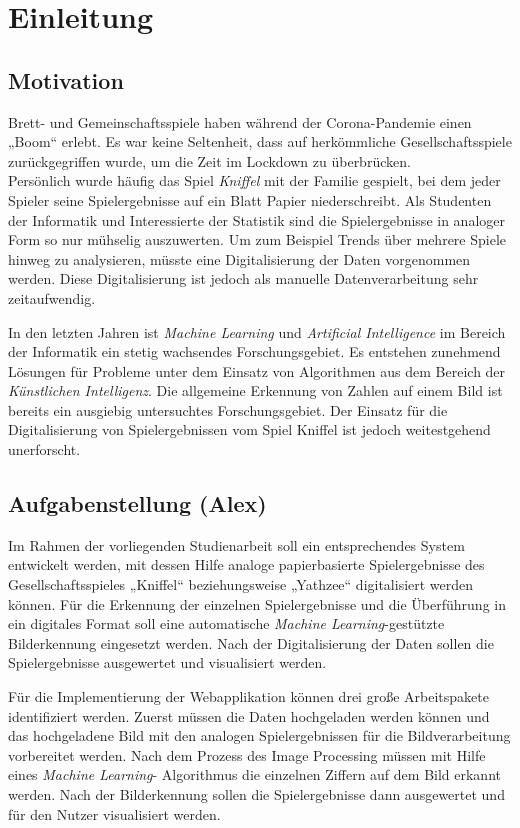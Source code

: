 \chapter{Einleitung}
\section{Motivation}
Brett- und Gemeinschaftsspiele haben während der Corona-Pandemie einen „Boom“ erlebt. Es war keine Seltenheit, dass auf herkömmliche Gesellschaftsspiele zurückgegriffen wurde, um die Zeit im Lockdown zu überbrücken. \cite{dw_2021}\\
Persönlich wurde häufig das Spiel \textit{Kniffel} mit der Familie gespielt, bei dem jeder Spieler seine Spielergebnisse auf ein Blatt Papier niederschreibt. Als Studenten der Informatik und Interessierte der Statistik sind die Spielergebnisse in analoger Form so nur mühselig auszuwerten. Um zum Beispiel Trends über mehrere Spiele hinweg zu analysieren, müsste eine Digitalisierung der Daten vorgenommen werden. Diese Digitalisierung ist jedoch als manuelle Datenverarbeitung sehr zeitaufwendig.

In den letzten Jahren ist \textit{Machine Learning} und \textit{Artificial Intelligence} im Bereich der Informatik ein stetig wachsendes Forschungsgebiet. 
Es entstehen zunehmend Lösungen für Probleme unter dem Einsatz von Algorithmen aus dem Bereich der \textit{Künstlichen Intelligenz}. Die allgemeine Erkennung von Zahlen auf einem Bild ist bereits ein ausgiebig untersuchtes Forschungsgebiet. Der Einsatz für die Digitalisierung von Spielergebnissen vom Spiel Kniffel ist jedoch weitestgehend unerforscht. 

\section{Aufgabenstellung (Alex)}
Im Rahmen der vorliegenden Studienarbeit soll ein entsprechendes System entwickelt werden, mit dessen Hilfe analoge papierbasierte Spielergebnisse des
Gesellschaftsspieles „Kniffel“ beziehungsweise „Yathzee“ digitalisiert werden können. Für die Erkennung der einzelnen Spielergebnisse und die Überführung in ein digitales Format soll eine automatische \textit{Machine Learning}-gestützte Bilderkennung eingesetzt werden. Nach der Digitalisierung der Daten sollen die Spielergebnisse ausgewertet und visualisiert werden.

Für die Implementierung der Webapplikation können drei große Arbeitspakete identifiziert werden. Zuerst müssen die Daten hochgeladen werden können und das hochgeladene Bild mit den analogen Spielergebnissen für die Bildverarbeitung vorbereitet werden. Nach dem Prozess des Image Processing müssen mit Hilfe eines \textit{Machine Learning}-
Algorithmus die einzelnen Ziffern auf dem Bild erkannt werden.
Nach der Bilderkennung sollen die Spielergebnisse dann ausgewertet und für den Nutzer visualisiert werden.

